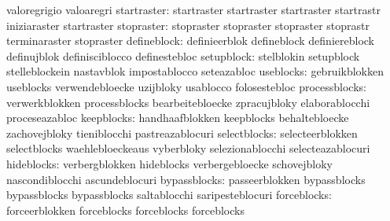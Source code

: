                                   valoregrigio                     valoaregri
                    startraster:  startraster                      startraster
                                  startraster                      startrastr
                                  iniziaraster                     startraster %
                     stopraster:  stopraster                       stopraster
                                  stopraster                       stoprastr
                                  terminaraster                    stopraster
                    defineblock:  definieerblok                    defineblock
                                  definiereblock                   definujblok
                                  definisciblocco                  definestebloc
                     setupblock:  stelblokin                       setupblock
                                  stelleblockein                   nastavblok
                                  impostablocco                    seteazabloc
                      useblocks:  gebruikblokken                   useblocks
                                  verwendebloecke                  uzijbloky
                                  usablocco                        folosestebloc
                  processblocks:  verwerkblokken                   processblocks
                                  bearbeitebloecke                 zpracujbloky
                                  elaborablocchi                   proceseazabloc
                     keepblocks:  handhaafblokken                  keepblocks
                                  behaltebloecke                   zachovejbloky
                                  tieniblocchi                     pastreazablocuri
                   selectblocks:  selecteerblokken                 selectblocks
                                  waehlebloeckeaus                 vyberbloky
                                  selezionablocchi                 selecteazablocuri
                     hideblocks:  verbergblokken                   hideblocks
                                  verbergebloecke                  schovejbloky
                                  nascondiblocchi                  ascundeblocuri
                   bypassblocks:  passeerblokken                   bypassblocks
                                  bypassblocks                     bypassblocks
                                  saltablocchi                     saripesteblocuri
                    forceblocks:  forceerblokken                   forceblocks
                                  forceblocks                      forceblocks
